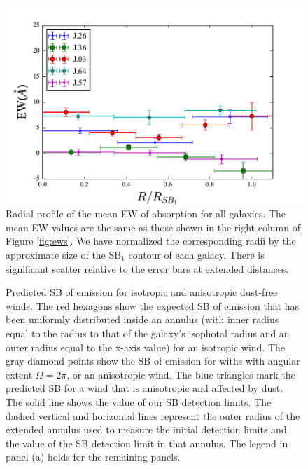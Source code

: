 \documentclass[twocolumn]{aastex61}
\begin{document}
\begin{figure}[!htb]
\centering
\includegraphics[scale=0.9]{../Figures/ew_comb.pdf}
\caption{Radial profile of the mean EW of  absorption for all galaxies. The mean EW values are the same as those shown in the right column of Figure \ref{fig:ews}. We have normalized the corresponding radii by the approximate size of the SB$_1$ contour of each galacy. There is significant scatter relative to the error bars at extended distances.}
\label{fig:ew_comb}
\end{figure}

\begin{figure}[h]
\centering
{}
\caption{Predicted SB of  emission for isotropic and anisotropic dust-free winds. The red hexagons show the expected SB of emission that has been uniformly distributed inside an annulus (with inner radius equal to the radius to that of the galaxy's isophotal radius and an outer radius equal to the x-axis value) for an isotropic wind. The gray diamond points show the SB of  emission for withs with angular extent $\Omega=2\pi$, or an anisotropic wind. The blue triangles mark the predicted SB for a wind that is anisotropic and affected by dust. The solid line shows the value of our SB detection limits. The dashed vertical and horizontal lines represent the outer radius of the extended annulus used to measure the initial detection limits and the value of the SB detection limit in that annulus. The legend in panel (a) holds for the remaining panels.}
\label{fig.emission}
\end{figure}




\end{document}
